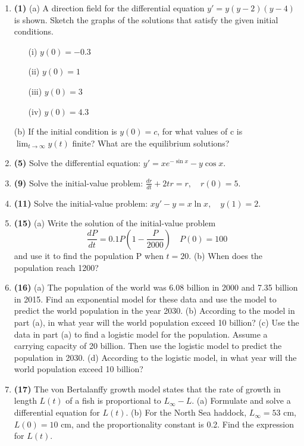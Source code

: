\documentclass[12pt, a4paper]{article}
\begin{document}
\begin{enumerate}
    \item \textbf{(1)} (a) A direction field for the differential equation $y' = y(y-2)(y-4)$ is shown. Sketch the graphs of the solutions that satisfy the given initial conditions.
    \begin{itemize}
        \item[(i)] $y(0) = -0.3$
        \item[(ii)] $y(0) = 1$
        \item[(iii)] $y(0) = 3$
        \item[(iv)] $y(0) = 4.3$
    \end{itemize}
    (b) If the initial condition is $y(0)=c$, for what values of c is $\lim_{t\to\infty} y(t)$ finite? What are the equilibrium solutions?

    \item \textbf{(5)} Solve the differential equation: $y' = xe^{-\sin x} - y\cos x$.

    \item \textbf{(9)} Solve the initial-value problem: $\frac{dr}{dt} + 2tr = r, \quad r(0) = 5$.
    
    \item \textbf{(11)} Solve the initial-value problem: $xy' - y = x\ln x, \quad y(1) = 2$.

    \item \textbf{(15)} (a) Write the solution of the initial-value problem
    \[ \frac{dP}{dt} = 0.1P\left(1 - \frac{P}{2000}\right) \quad P(0) = 100 \]
    and use it to find the population P when $t=20$.
    (b) When does the population reach 1200?

    \item \textbf{(16)} (a) The population of the world was 6.08 billion in 2000 and 7.35 billion in 2015. Find an exponential model for these data and use the model to predict the world population in the year 2030.
    (b) According to the model in part (a), in what year will the world population exceed 10 billion?
    (c) Use the data in part (a) to find a logistic model for the population. Assume a carrying capacity of 20 billion. Then use the logistic model to predict the population in 2030.
    (d) According to the logistic model, in what year will the world population exceed 10 billion?

    \item \textbf{(17)} The von Bertalanffy growth model states that the rate of growth in length $L(t)$ of a fish is proportional to $L_{\infty} - L$.
    (a) Formulate and solve a differential equation for $L(t)$.
    (b) For the North Sea haddock, $L_{\infty} = 53$ cm, $L(0) = 10$ cm, and the proportionality constant is 0.2. Find the expression for $L(t)$.


\end{enumerate}
\end{document}
